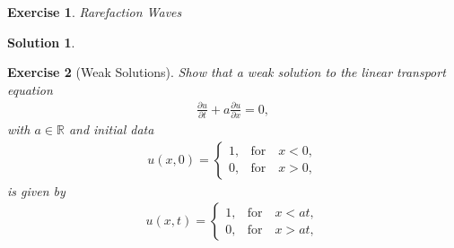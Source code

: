 \documentclass[10pt,letterpaper]{article}
\theoremstyle{break}
\newtheorem{exercise}{Exercise}
\newtheorem{solution}{Solution}
\begin{document}
\begin{exercise}{Rarefaction Waves}
\end{exercise}

\begin{solution}
    
\end{solution}



\begin{exercise}[Weak Solutions]
    Show that a weak solution to the linear transport equation 
    \begin{gather*}
    	\frac{\partial u}{\partial t} 
    	+ 
    	a 
    	\frac{\partial u}{\partial x}  = 0, 
    \end{gather*}
    with $a\in \mathbb{R}$ and initial data 
    \begin{align}
    	u(x,0) = 
    	\left\{
    	\begin{array}{ll}
    	1, & \text{for} \quad x<0,\\
    	0, &\text{for} \quad x > 0,
    	\end{array}
    	\right.
    \end{align}
    is given by
    \begin{align} 
    	u(x,t) = 
    	\left\{
    	\begin{array}{ll}
    	1, & \text{for} \quad x<at,\\
    	0, & \text{for} \quad x > at,
    	\end{array}
    	\right.
    \end{align}
\end{exercise}
\end{document}

